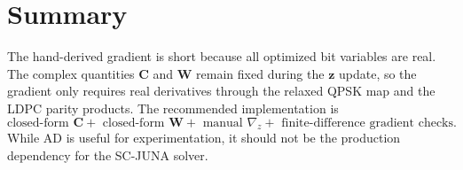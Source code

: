 \documentclass[11pt]{article}
\begin{document}
\section{Summary}

The hand-derived gradient is short because all optimized bit variables are real.  The complex quantities $\mathbf C$ and $\mathbf W$ remain fixed during the $\bm z$ update, so the gradient only requires real derivatives through the relaxed QPSK map and the LDPC parity products.  The recommended implementation is
\begin{equation}
\boxed{
\text{closed-form }\mathbf C
+\text{ closed-form }\mathbf W
+\text{ manual }\nabla_z
+\text{ finite-difference gradient checks}.}
\end{equation}
While AD is useful for experimentation, it should not be the production dependency for the SC-JUNA solver.
\end{document}
